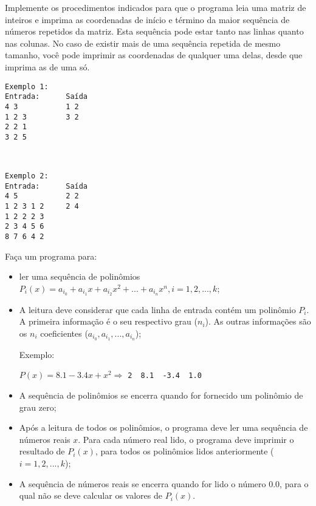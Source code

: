 Implemente os procedimentos indicados para 
que o programa leia uma matriz de inteiros e imprima as coordenadas
de início e término da maior sequência de números repetidos da matriz.
Esta sequência pode estar tanto nas linhas quanto nas colunas. No caso
de existir mais de uma sequência repetida de mesmo tamanho, você pode
imprimir as coordenadas de qualquer uma delas, desde que imprima as de uma só.

\begin{minipage}{7cm}
\begin{verbatim}
Exemplo 1:
Entrada:      Saída
4 3           1 2 
1 2 3         3 2
2 2 1
3 2 5
\end{verbatim}
\end{minipage} \  
\begin{minipage}{7cm}
\begin{verbatim}
Exemplo 2:
Entrada:      Saída
4 5           2 2
1 2 3 1 2     2 4
1 2 2 2 3
2 3 4 5 6
8 7 6 4 2
\end{verbatim}
\end{minipage}



\item Faça um programa para:
\begin{itemize}
    \item ler uma sequência de polinômios 
    $P_i(x)=a_{i_0} + a_{i_1}x + a_{i_2}x^2 + ... + a_{i_n}x^n, i=1,2,...,k$; 

    \item A leitura deve considerar que cada linha de entrada    
    contém um polinômio $P_i$. A primeira informação é o seu 
    respectivo grau ($n_i$). As outras informações são os
    $n_i$ coeficientes ($a_{i_0}, a_{i_1}, ..., a_{i_n}$);
    
    Exemplo:
    
    $P(x) = 8.1 -3.4x + x^2  \Longrightarrow $ \verb|2  8.1  -3.4  1.0|
    
    \item A sequência de polinômios se encerra quando for fornecido um 
    polinômio de grau zero; 
    
    \item Após a leitura de todos os polinômios, o programa deve ler uma 
    sequência de números reais $x$. Para cada número real lido, o programa 
    deve imprimir o resultado de $P_i(x)$, para todos os polinômios lidos 
    anteriormente ($i=1,2,...,k$);
    
    \item A sequência de números reais se encerra quando for lido o número 
    $0.0$, para o qual não se deve calcular os valores de $P_i(x)$.
\end{itemize}    
    
